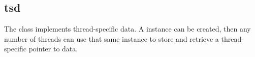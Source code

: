 %
%
%
%
%

\subsection{tsd}
\label{tsd}

The  class implements thread-specific data.  A 
instance can be created, then any number of threads can use that same instance
to store and retrieve a thread-specific pointer to data.

